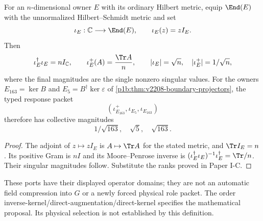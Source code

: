 \documentclass[12pt,a4paper]{article}
\begin{document}
\begin{proposition}
\label{p6:prop:v2208-collective-rank-word}
For an $n$-dimensional owner $E$ with its ordinary Hilbert metric, equip
$\End(E)$ with the unnormalized Hilbert--Schmidt metric and set
\[
 \iota_E:\mathbb C\longrightarrow\End(E),\qquad
 \iota_E(z)=zI_E.
\]
Then
\[
 \iota_E^\dagger\iota_E=nI_{\mathbb C},\qquad
 \iota_E^+(A)=\frac{\Tr A}{n},\qquad
 |\iota_E|=\sqrt n,\quad |\iota_E^+|=1/\sqrt n,
\]
where the final magnitudes are the single nonzero singular values.
For the owners
$E_{163}=\ker B$ and $E_5=B^\dagger\ker\varepsilon$ of
\ref{p1b:thm:v2208-boundary-projectors}, the typed response packet
\[
 (\iota_{E_{163}}^+,\iota_{E_5},\iota_{E_{163}})
\]
therefore has collective magnitudes
\[
 \boxed{1/\sqrt{163},\quad\sqrt5,\quad\sqrt{163}.}
\]
\end{proposition}
\begin{proof}
The adjoint of $z\mapsto zI_E$ is $A\mapsto\Tr A$ for the stated metric,
and $\Tr I_E=n$. Its positive Gram is $nI$ and its Moore--Penrose
inverse is $(\iota_E^\dagger\iota_E)^{-1}\iota_E^\dagger=\Tr/n$.
Their singular magnitudes follow. Substitute the ranks proved in Paper I-C.
\end{proof}
These ports have their displayed operator domains; they are not an
automatic field compression into $G$ or a newly forced physical role packet.
The order inverse-kernel/direct-augmentation/direct-kernel specifies the
mathematical proposal. Its physical selection is not established by this definition.
\end{document}
